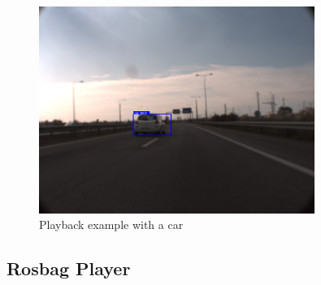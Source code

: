\begin{figure}[htp]
	
	\centering
	\includegraphics[width=0.8\textwidth]{caplabel/imgs/playback.png}
	
	\caption{Playback example with a car}
	\label{fig:playback}
	
\end{figure}

\subsection{Rosbag Player}